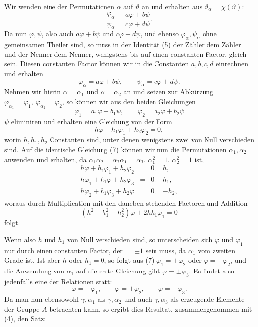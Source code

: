 \documentclass[11pt]{article}
\begin{document}
Wir wenden eine der Permutationen \(\alpha\) auf \(\vartheta\) an und erhalten aus \(\vartheta_\alpha=\chi(\vartheta)\):
\begin{equation}
\frac{\varphi_\alpha}{\psi_\alpha}
=
\frac{a\varphi+b\psi}{c\varphi+d\psi}.
\tag{5}
\end{equation}
Da nun \(\varphi,\psi\), also auch \(a\varphi+b\psi\) und \(c\varphi+d\psi\), und ebenso \(\varphi_\alpha,\psi_\alpha\) ohne gemeinsamen Theiler sind, so muss in der Identität (5) der Zähler dem Zähler und der Nenner dem Nenner, wenigstens bis auf einen constanten Factor, gleich sein. Diesen constanten Factor können wir in die Constanten \(a,b,c,d\) einrechnen und erhalten
\begin{equation}
\varphi_\alpha=a\varphi+b\psi,\qquad
\psi_\alpha=c\varphi+d\psi.
\tag{6}
\end{equation}
Nehmen wir hierin \(\alpha=\alpha_1\) und \(\alpha=\alpha_2\) an und setzen zur Abkürzung \(\varphi_{\alpha_1}=\varphi_1,\ \varphi_{\alpha_2}=\varphi_2\), so können wir aus den beiden Gleichungen
\[
\varphi_1=a_1\varphi+b_1\psi,\qquad
\varphi_2=a_2\varphi+b_2\psi
\]
\(\psi\) eliminiren und erhalten eine Gleichung von der Form
\begin{equation}
h\varphi+h_1\varphi_1+h_2\varphi_2=0,
\tag{7}
\end{equation}
worin \(h,h_1,h_2\) Constanten sind, unter denen wenigstens zwei von Null verschieden sind. Auf die identische Gleichung (7) können wir nun die Permutationen \(\alpha_1,\alpha_2\) anwenden und erhalten, da \(\alpha_1\alpha_2=\alpha_2\alpha_1=\alpha_3\), \(\alpha_1^2=1\), \(\alpha_2^2=1\) ist,
\[
\begin{array}{rcll}
h\varphi+h_1\varphi_1+h_2\varphi_2&=&0,&h,\\
h\varphi_1+h_1\varphi+h_2\varphi_3&=&0,&h_1,\\
h\varphi_2+h_1\varphi_3+h_2\varphi&=&0,&-h_2,
\end{array}
\]
woraus durch Multiplication mit den daneben stehenden Factoren und Addition
\begin{equation}
(h^2+h_1^2-h_2^2)\varphi+2hh_1\varphi_1=0
\tag{8}
\end{equation}
folgt.

Wenn also \(h\) und \(h_1\) von Null verschieden sind, so unterscheiden sich \(\varphi\) und \(\varphi_1\) nur durch einen constanten Factor, der \(=\pm1\) sein muss, da \(\alpha_1\) vom zweiten Grade ist. Ist aber \(h\) oder \(h_1=0\), so folgt aus (7) \(\varphi_1=\pm\varphi_2\) oder \(\varphi=\pm\varphi_2\), und die Anwendung von \(\alpha_1\) auf die erste Gleichung gibt \(\varphi=\pm\varphi_3\). Es findet also jedenfalls eine der Relationen statt:
\begin{equation}
\varphi=\pm\varphi_1,\qquad
\varphi=\pm\varphi_2,\qquad
\varphi=\pm\varphi_3.
\tag{9}
\end{equation}
Da man nun ebensowohl \(\gamma,\alpha_1\) als \(\gamma,\alpha_2\) und auch \(\gamma,\alpha_3\) als erzeugende Elemente der Gruppe \(A\) betrachten kann, so ergibt dies Resultat, zusammengenommen mit (4), den Satz:
\end{document}
